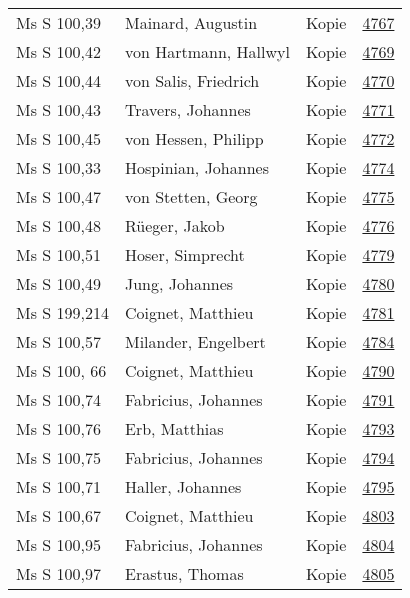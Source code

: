 \documentclass[10pt,a4paper,landscape]{report}
\begin{document}
\begin{longtable}{p{16cm}p{4cm}lr}
Ms S 100,39	&	Mainard, Augustin	&	Kopie	&	\href{http://130.60.24.72/assignment/4767}{4767}\\
Ms S 100,42	&	von Hartmann, Hallwyl	&	Kopie	&	\href{http://130.60.24.72/assignment/4769}{4769}\\
Ms S 100,44	&	von Salis, Friedrich	&	Kopie	&	\href{http://130.60.24.72/assignment/4770}{4770}\\
Ms S 100,43	&	Travers, Johannes	&	Kopie	&	\href{http://130.60.24.72/assignment/4771}{4771}\\
Ms S 100,45	&	von Hessen, Philipp	&	Kopie	&	\href{http://130.60.24.72/assignment/4772}{4772}\\
Ms S 100,33	&	Hospinian, Johannes	&	Kopie	&	\href{http://130.60.24.72/assignment/4774}{4774}\\
Ms S 100,47	&	von Stetten, Georg	&	Kopie	&	\href{http://130.60.24.72/assignment/4775}{4775}\\
Ms S 100,48	&	Rüeger, Jakob	&	Kopie	&	\href{http://130.60.24.72/assignment/4776}{4776}\\
Ms S 100,51	&	Hoser, Simprecht	&	Kopie	&	\href{http://130.60.24.72/assignment/4779}{4779}\\
Ms S 100,49	&	Jung, Johannes	&	Kopie	&	\href{http://130.60.24.72/assignment/4780}{4780}\\
Ms S 199,214	&	Coignet, Matthieu	&	Kopie	&	\href{http://130.60.24.72/assignment/4781}{4781}\\
Ms S 100,57	&	Milander, Engelbert	&	Kopie	&	\href{http://130.60.24.72/assignment/4784}{4784}\\
Ms S 100, 66	&	Coignet, Matthieu	&	Kopie	&	\href{http://130.60.24.72/assignment/4790}{4790}\\
Ms S 100,74	&	Fabricius, Johannes	&	Kopie	&	\href{http://130.60.24.72/assignment/4791}{4791}\\
Ms S 100,76	&	Erb, Matthias	&	Kopie	&	\href{http://130.60.24.72/assignment/4793}{4793}\\
Ms S 100,75	&	Fabricius, Johannes	&	Kopie	&	\href{http://130.60.24.72/assignment/4794}{4794}\\
Ms S 100,71	&	Haller, Johannes	&	Kopie	&	\href{http://130.60.24.72/assignment/4795}{4795}\\
Ms S 100,67	&	Coignet, Matthieu	&	Kopie	&	\href{http://130.60.24.72/assignment/4803}{4803}\\
Ms S 100,95	&	Fabricius, Johannes	&	Kopie	&	\href{http://130.60.24.72/assignment/4804}{4804}\\
Ms S 100,97	&	Erastus, Thomas	&	Kopie	&	\href{http://130.60.24.72/assignment/4805}{4805}\\

\end{longtable}
\end{document}
